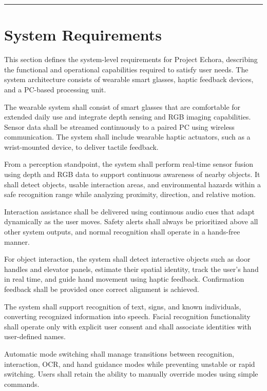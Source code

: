 \par\medskip\noindent\rule{\linewidth}{0.4pt}\par\medskip

\section{System Requirements}

This section defines the system-level requirements for Project Echora, describing the functional and operational capabilities required to satisfy user needs. The system architecture consists of wearable smart glasses, haptic feedback devices, and a PC-based processing unit.

The wearable system shall consist of smart glasses that are comfortable for extended daily use and integrate depth sensing and RGB imaging capabilities. Sensor data shall be streamed continuously to a paired PC using wireless communication. The system shall include wearable haptic actuators, such as a wrist-mounted device, to deliver tactile feedback.

From a perception standpoint, the system shall perform real-time sensor fusion using depth and RGB data to support continuous awareness of nearby objects. It shall detect objects, usable interaction areas, and environmental hazards within a safe recognition range while analyzing proximity, direction, and relative motion.

Interaction assistance shall be delivered using continuous audio cues that adapt dynamically as the user moves. Safety alerts shall always be prioritized above all other system outputs, and normal recognition shall operate in a hands-free manner.

For object interaction, the system shall detect interactive objects such as door handles and elevator panels, estimate their spatial identity, track the user’s hand in real time, and guide hand movement using haptic feedback. Confirmation feedback shall be provided once correct alignment is achieved.

The system shall support recognition of text, signs, and known individuals, converting recognized information into speech. Facial recognition functionality shall operate only with explicit user consent and shall associate identities with user-defined names.

Automatic mode switching shall manage transitions between recognition, interaction, OCR, and hand guidance modes while preventing unstable or rapid switching. Users shall retain the ability to manually override modes using simple commands.


